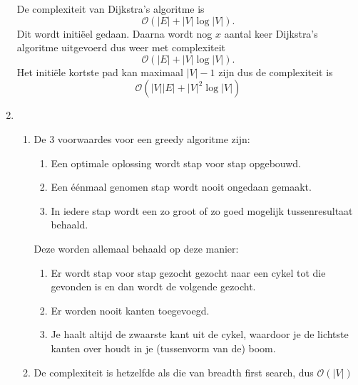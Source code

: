 \documentclass[11pt]{article}
\newcommand{\bigO}{\ensuremath{\mathcal{O}}}
\begin{document}
\begin{enumerate}
        De complexiteit van Dijkstra's algoritme is $$\bigO(|E| + |V|\log|V|).$$
        Dit wordt initiëel gedaan. Daarna wordt nog $x$ aantal keer Dijkstra's
        algoritme uitgevoerd dus weer met complexiteit
        $$\bigO(|E| + |V|\log|V|).$$
        Het initiële kortste pad kan maximaal $|V|-1$ zijn dus de complexiteit
        is $$\bigO(|V||E| + |V|^2\log|V|)$$
    \item
        \begin{enumerate}
            \item
                De 3 voorwaardes voor een greedy algoritme zijn:

                \begin{enumerate}[\bfseries 1.]

                    \item Een optimale oplossing wordt stap voor stap opgebouwd.

                    \item Een éénmaal genomen stap wordt nooit ongedaan gemaakt.

                    \item In iedere stap wordt een zo groot of zo goed mogelijk
                        tussenresultaat behaald.

                \end{enumerate}

                Deze worden allemaal behaald op deze manier:

                \begin{enumerate}[\bfseries 1.]

                    \item Er wordt stap voor stap gezocht gezocht naar een cykel
                        tot die gevonden is en dan wordt de volgende gezocht.

                    \item Er worden nooit kanten toegevoegd.

                    \item Je haalt altijd de zwaarste kant uit de cykel,
                        waardoor je de lichtste kanten over houdt in je
                        (tussenvorm van de) boom.

                \end{enumerate}

            \item De complexiteit is hetzelfde als die van breadth first search,
                dus $\bigO(|V|)$
        \end{enumerate}



\end{enumerate}
\end{document}
